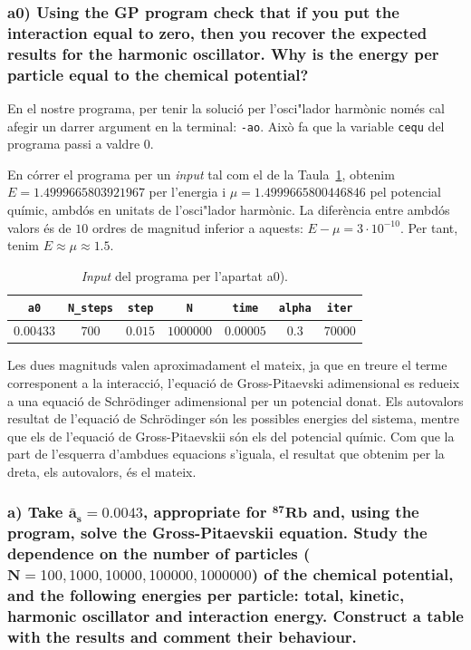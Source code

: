 \documentclass[a4paper]{article}
\begin{document}
\subsubsection*{a0) Using the GP program check that if you put the interaction equal to zero, then you recover the expected results
for the harmonic oscillator. Why is the energy per particle equal to the chemical potential?}

En el nostre programa, per tenir la solució per l'osci"lador harmònic només cal afegir un darrer argument en la terminal: \texttt{-ao}. Això fa que la variable \texttt{cequ} del programa passi a valdre $0$.

En córrer el programa per un \textit{input} tal com el de la Taula~\ref{tab:input_a0}, obtenim $E=1.4999665803921967$ per l'energia i $\mu=1.4999665800446846$ pel potencial químic, ambdós en unitats de l'osci"lador harmònic. La diferència entre ambdós valors és de $10$ ordres de magnitud inferior a aquests: $E-\mu=3\cdot10^{-10}$. Per tant, tenim $E\approx \mu\approx 1.5$. 

\begin{table}[H]
    \centering
    \begin{tabular}{|c|c|c|c|c|c|c|}
        \hline
        \rowcolor[HTML]{EFEFEF}
        \textbf{\texttt{a0}} & \textbf{\texttt{N\_steps}} & \textbf{\texttt{step}} &\textbf{\texttt{N}} & \textbf{\texttt{time}} & \textbf{\texttt{alpha}} & \textbf{\texttt{iter}} \\ \hline\hline
        $0.00433$ & $700$ & $0.015$ & $1000000$ & $0.00005$ & $0.3$ & $70000$ \\ \hline
    \end{tabular}
\caption{\textit{Input} del programa per l'apartat a0).}
\label{tab:input_a0}
\end{table}

Les dues magnituds valen aproximadament el mateix, ja que en treure el terme corresponent a la interacció, l'equació de Gross-Pitaevski adimensional es redueix a una equació de Schrödinger adimensional per un potencial donat. Els autovalors resultat de l'equació de Schrödinger són les possibles energies del sistema, mentre que els de l'equació de Gross-Pitaevskii són els del potencial químic. Com que la part de l'esquerra d'ambdues equacions s'iguala, el resultat que obtenim per la dreta, els autovalors, és el mateix.

\subsubsection*{a) Take $\mathbf{\bar a_s = 0.0043}$, appropriate for $\mathbf{^{87}Rb}$ and, using the program, solve the Gross-Pitaevskii equation. Study the dependence on the number of particles ($\mathbf{N}=100, 1000, 10000, 100000, 1000000$) of the chemical potential, and the following energies per particle: total, kinetic, harmonic oscillator and interaction energy. Construct a table with the results and comment their behaviour.}
\end{document}
